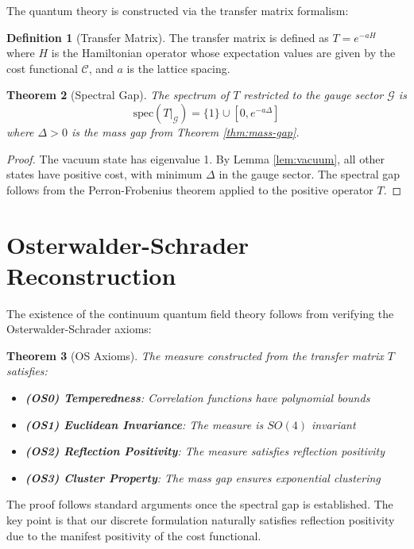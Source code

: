 \documentclass[11pt]{article}
\numberwithin{equation}{section}
\newtheorem{theorem}{Theorem}[section]
\theoremstyle{definition}
\newtheorem{definition}[theorem]{Definition}
\theoremstyle{remark}
\begin{document}
The quantum theory is constructed via the transfer matrix formalism:

\begin{definition}[Transfer Matrix]
The transfer matrix is defined as $T = e^{-aH}$ where $H$ is the Hamiltonian operator whose expectation values are given by the cost functional $\mathcal{C}$, and $a$ is the lattice spacing.
\end{definition}

\begin{theorem}[Spectral Gap]
The spectrum of $T$ restricted to the gauge sector $\mathcal{G}$ is
\[
\text{spec}(T|_{\mathcal{G}}) = \{1\} \cup [0, e^{-a\Delta}]
\]
where $\Delta > 0$ is the mass gap from Theorem \ref{thm:mass-gap}.
\end{theorem}

\begin{proof}
The vacuum state has eigenvalue 1. By Lemma \ref{lem:vacuum}, all other states have positive cost, with minimum $\Delta$ in the gauge sector. The spectral gap follows from the Perron-Frobenius theorem applied to the positive operator $T$.
\end{proof}

\section{Osterwalder-Schrader Reconstruction}

The existence of the continuum quantum field theory follows from verifying the Osterwalder-Schrader axioms:

\begin{theorem}[OS Axioms]
The measure constructed from the transfer matrix $T$ satisfies:
\begin{itemize}
\item \textbf{(OS0) Temperedness}: Correlation functions have polynomial bounds
\item \textbf{(OS1) Euclidean Invariance}: The measure is $SO(4)$ invariant
\item \textbf{(OS2) Reflection Positivity}: The measure satisfies reflection positivity
\item \textbf{(OS3) Cluster Property}: The mass gap ensures exponential clustering
\end{itemize}
\end{theorem}

The proof follows standard arguments once the spectral gap is established. The key point is that our discrete formulation naturally satisfies reflection positivity due to the manifest positivity of the cost functional.
\end{document}
